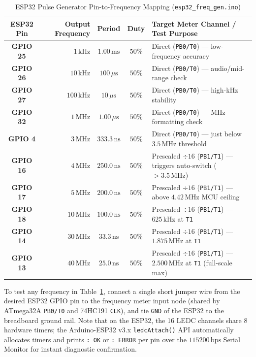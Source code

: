 \documentclass[11pt,a4paper]{article}
\begin{document}
\begin{table}[H]
\centering\small
\caption{ESP32 Pulse Generator Pin-to-Frequency Mapping (\texttt{esp32\_freq\_gen.ino})}
\label{tab:esp_pins}
\renewcommand{\arraystretch}{1.18}
\begin{tabularx}{\textwidth}{>{\ttfamily\bfseries}c r c c X}
\toprule
\textbf{ESP32 Pin} & \textbf{Output Frequency} & \textbf{Period} & \textbf{Duty} & \textbf{Target Meter Channel / Test Purpose} \\
\midrule
GPIO 25 & $1\,\text{kHz}$   & $1.00\,\text{ms}$   & $50\%$ & Direct (\texttt{PB0/T0}) --- low-frequency accuracy \\
GPIO 26 & $10\,\text{kHz}$  & $100\,\mu\text{s}$  & $50\%$ & Direct (\texttt{PB0/T0}) --- audio/mid-range check \\
GPIO 27 & $100\,\text{kHz}$ & $10\,\mu\text{s}$   & $50\%$ & Direct (\texttt{PB0/T0}) --- high-kHz stability \\
GPIO 32 & $1\,\text{MHz}$   & $1.00\,\mu\text{s}$ & $50\%$ & Direct (\texttt{PB0/T0}) --- MHz formatting check \\
GPIO 4  & $3\,\text{MHz}$   & $333.3\,\text{ns}$  & $50\%$ & Direct (\texttt{PB0/T0}) --- just below $3.5\,\text{MHz}$ threshold \\
\midrule
GPIO 16 & $4\,\text{MHz}$   & $250.0\,\text{ns}$  & $50\%$ & Prescaled $\div 16$ (\texttt{PB1/T1}) --- triggers auto-switch ($>3.5\,\text{MHz}$) \\
GPIO 17 & $5\,\text{MHz}$   & $200.0\,\text{ns}$  & $50\%$ & Prescaled $\div 16$ (\texttt{PB1/T1}) --- above $4.42\,\text{MHz}$ MCU ceiling \\
GPIO 18 & $10\,\text{MHz}$  & $100.0\,\text{ns}$  & $50\%$ & Prescaled $\div 16$ (\texttt{PB1/T1}) --- $625\,\text{kHz}$ at \texttt{T1} \\
GPIO 14 & $30\,\text{MHz}$  & $33.3\,\text{ns}$   & $50\%$ & Prescaled $\div 16$ (\texttt{PB1/T1}) --- $1.875\,\text{MHz}$ at \texttt{T1} \\
GPIO 13 & $40\,\text{MHz}$  & $25.0\,\text{ns}$   & $50\%$ & Prescaled $\div 16$ (\texttt{PB1/T1}) --- $2.500\,\text{MHz}$ at \texttt{T1} (full-scale max) \\
\bottomrule
\end{tabularx}
\end{table}

\begin{infobox}
To test any frequency in Table~\ref{tab:esp_pins}, connect a single short jumper wire from the desired ESP32 GPIO pin to the frequency meter input node (shared by ATmega32A \texttt{PB0/T0} and 74HC191 \texttt{CLK}), and tie \texttt{GND} of the ESP32 to the breadboard ground rail. Note that on the ESP32, the 16 LEDC channels share 8 hardware timers; the Arduino-ESP32 v3.x \texttt{ledcAttach()} API automatically allocates timers and prints \texttt{: OK} or \texttt{: ERROR} per pin over the $115200\,\text{bps}$ Serial Monitor for instant diagnostic confirmation.
\end{infobox}
\end{document}
